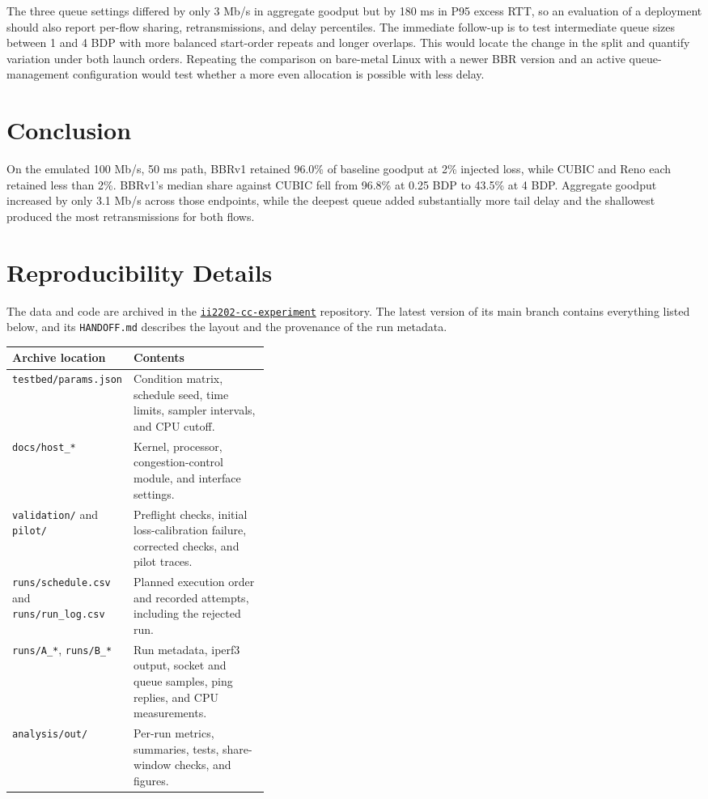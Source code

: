 \documentclass[11pt,a4paper]{article}
\begin{document}
The three queue settings differed by only 3 Mb/s in aggregate goodput but by 180 ms in P95 excess RTT, so an evaluation of a deployment should also report per-flow sharing, retransmissions, and delay percentiles. The immediate follow-up is to test intermediate queue sizes between 1 and 4 BDP with more balanced start-order repeats and longer overlaps. This would locate the change in the split and quantify variation under both launch orders. Repeating the comparison on bare-metal Linux with a newer BBR version and an active queue-management configuration would test whether a more even allocation is possible with less delay.

\section{Conclusion}

On the emulated 100 Mb/s, 50 ms path, BBRv1 retained 96.0\% of baseline goodput at 2\% injected loss, while CUBIC and Reno each retained less than 2\%. BBRv1's median share against CUBIC fell from 96.8\% at 0.25 BDP to 43.5\% at 4 BDP. Aggregate goodput increased by only 3.1 Mb/s across those endpoints, while the deepest queue added substantially more tail delay and the shallowest produced the most retransmissions for both flows.

\clearpage



\clearpage
\appendix
\section{Reproducibility Details}
\label{app:repro}

The data and code are archived in the \href{https://github.com/icannotworkoutaname/ii2202-cc-experiment}{\texttt{ii2202-cc-experiment}} repository. The latest version of its main branch contains everything listed below, and its \texttt{HANDOFF.md} describes the layout and the provenance of the run metadata.

\begin{tabularx}{\linewidth}{@{}>{\raggedright\arraybackslash}p{0.37\linewidth}X@{}}
\toprule
Archive location & Contents \\
\midrule
\texttt{testbed/params.json} & Condition matrix, schedule seed, time limits, sampler intervals, and CPU cutoff. \\
\texttt{docs/host\_*} & Kernel, processor, congestion-control module, and interface settings. \\
\texttt{validation/} and \texttt{pilot/} & Preflight checks, initial loss-calibration failure, corrected checks, and pilot traces. \\
\texttt{runs/schedule.csv} and \texttt{runs/run\_log.csv} & Planned execution order and recorded attempts, including the rejected run. \\
\texttt{runs/A\_*}, \texttt{runs/B\_*} & Run metadata, iperf3 output, socket and queue samples, ping replies, and CPU measurements. \\
\texttt{analysis/out/} & Per-run metrics, summaries, tests, share-window checks, and figures. \\
\bottomrule
\end{tabularx}
\end{document}
